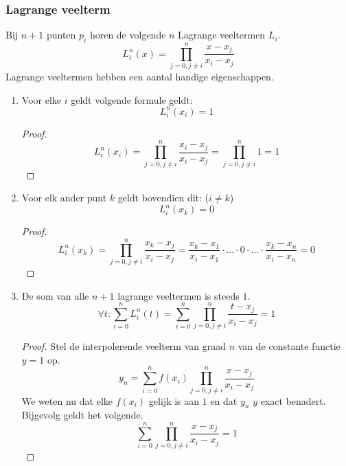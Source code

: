 \documentclass[computergesteund_ontwerp_van_curven_en_oppervlakken.tex]{subfiles}
\begin{document}
\subsubsection{Lagrange veelterm}
Bij $n+1$ punten $p_i$ horen de volgende $n$ Lagrange veeltermen $L_i$.
\[
L_{i}^{n}(x) = \prod_{j=0, j \neq i}^{n} \frac{x-x_{j}}{x_{i}-x_{j}}
\]
Lagrange veeltermen hebben een aantal handige eigenschappen.
\begin{enumerate}
\item Voor elke $i$ geldt volgende formule geldt:
\[
L_{i}^{n}(x_i) = 1
\]
\begin{proof}

\[
L_{i}^{n}(x_i)
= \prod_{j=0, j \neq i}^{n} \frac{x_i-x_{j}}{x_{i}-x_{j}}
= \prod_{j=0, j \neq i}^{n} 1
= 1
\]
\end{proof}
\item Voor elk ander punt $k$ geldt bovendien dit: ($i\neq k$)
\[
L_i^{n}(x_k) = 0
\]
\begin{proof}
\[
L_{i}^{n}(x_k)
= \prod_{j=0, j \neq i}^{n} \frac{x_k-x_{j}}{x_{i}-x_{j}}
= \frac{x_k-x_{1}}{x_{i}-x_{1}}\cdot \ldots \cdot 0 \cdot \ldots \cdot \frac{x_k-x_{n}}{x_{i}-x_{n}}
= 0
\]
\end{proof}
\item De som van alle $n+1$ lagrange veeltermen is steeds $1$.
\[
\forall t: \sum_{i=0}^{n}L_i^{n}(t) = \sum_{i=0}^{n}\prod_{j=0, j \neq i}^{n} \frac{t-x_{j}}{x_{i}-x_{j}} = 1
\]
\begin{proof}
Stel de interpolerende veelterm van graad $n$ van de constante functie $y=1$ op.
\[
y_n = \sum_{i=0}^{n} f(x_i) \prod_{j=0,j\neq i}^{n}\frac{x-x_j}{x_i-x_j}
\]
We weten nu dat elke $f(x_i)$ gelijk is aan $1$ en dat $y_n$ $y$ exact benadert.
Bijgevolg geldt het volgende.
\[
\sum_{i=0}^{n}\prod_{j=0,j\neq i}^{n}\frac{x-x_j}{x_i-x_j} = 1
\]
\end{proof}

\end{enumerate}
\end{document}
